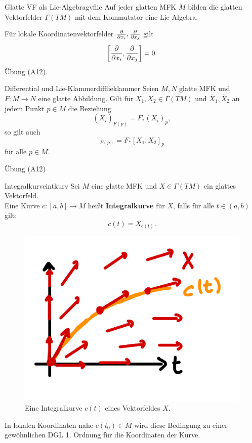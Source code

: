 \begin{korollar}{Glatte VF als Lie-Algebra}{gvflie}
Auf jeder glatten MFK $M$ bilden die glatten Vektorfelder $\Gamma (TM)$ mit dem Kommutator eine Lie-Algebra.
\end{korollar}
\begin{beweis}
Für lokale Koordinatenvektorfelder $\frac{\partial}{\partial x_i}, \frac{\partial}{\partial x_j}$ gilt
\begin{equation}
\left[ \frac{\partial}{\partial x_i}, \frac{\partial}{\partial x_j} \right] =0.
\end{equation}
Übung (A12).
\end{beweis}
\begin{satz}{Differential und Lie-Klammer}{difflieklammer}
Seien $M, N$ glatte MFK und $F: M \to N$ eine glatte Abbildung. Gilt für $X_1, X_2 \in \Gamma(TM)$ und $\bar{X}_1, \bar{X}_2$ an jedem Punkt $p \in M$ die Beziehung
\begin{equation}
(\bar{X}_i)_{F(p)} = F_\ast (X_i)_p,
\end{equation}
so gilt auch
\begin{equation}
[\bar{X}_1, \bar{X}_2]_{F(p)} = F_\ast [X_1, X_2]_p
\end{equation}
für alle $p \in M$.
\end{satz}
\begin{beweis}
Übung (A12)
\end{beweis}
\begin{definition}{Integralkurve}{intkurv}
Sei $M$ eine glatte MFK und $X \in \Gamma (TM)$ ein glattes Vektorfeld.\\
Eine Kurve $c: [a,b] \to M$ heißt \textbf{Integralkurve} für $X$, falls für alle $t \in (a,b)$ gilt:
\begin{equation}
\dot{c}(t) = X_{c(t)}.
\end{equation}
\begin{figure}[H]
\label{fig:integralkurve}
\centering
\includegraphics[width=0.25\linewidth]{Bilder/integralkurve.png}
\caption{Eine Integralkurve $c(t)$ eines Vektorfeldes $X$.}
\end{figure}
\end{definition}
In lokalen Koordinaten nahe $c(t_0) \in M$ wird diese Bedingung zu einer gewöhnlichen DGL 1. Ordnung für die Koordinaten der Kurve.
